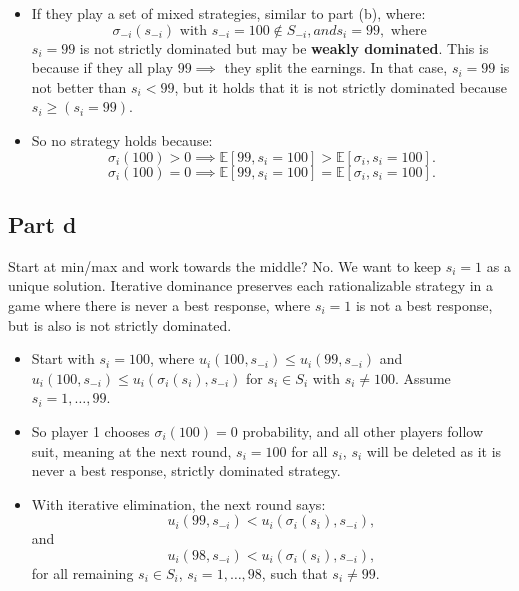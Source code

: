 \documentclass{article}
\begin{document}
\begin{itemize}
    \item If they play a set of mixed strategies, similar to part (b), where:
    \[
    \sigma_{-i}(s_{-i}) \text{ with } s_{-i} = 100 \notin S_{-i}, and s_i = 99, \text{ where }
    \]
    $s_i = 99$ is not strictly dominated but may be \textbf{weakly dominated}. This is because if they all play $99 \implies$ they split the earnings. In that case, $s_i = 99$ is not better than $s_i < 99$, but it holds that it is not strictly dominated because $s_i \geq (s_i = 99)$.
    
    \item So no strategy holds because:
    \[
    \sigma_i(100) > 0 \implies \mathbb{E}[99, s_i = 100] > \mathbb{E}[\sigma_i, s_i = 100].
    \]
    \[
    \sigma_i(100) = 0 \implies \mathbb{E}[99, s_i = 100] = \mathbb{E}[\sigma_i, s_i = 100].
    \]
\end{itemize}

\subsection{Part d}

Start at min/max and work towards the middle? No. We want to keep \( s_i = 1 \) as a unique solution. Iterative dominance preserves each rationalizable strategy in a game where there is never a best response, where \( s_i = 1 \) is not a best response, but is also is not strictly dominated.

\begin{itemize}
    \item Start with \( s_i = 100 \), where \( u_i(100, s_{-i}) \leq u_i(99, s_{-i}) \) and \( u_i(100, s_{-i}) \leq u_i(\sigma_i(s_i), s_{-i}) \) for \( s_i \in S_i \) with \( s_i \neq 100 \). Assume \( s_i = 1, \dots, 99 \).
    \item So player 1 chooses \( \sigma_i(100) = 0 \) probability, and all other players follow suit, meaning at the next round, \( s_i = 100 \) for all \( s_i \), \( s_i \) will be deleted as it is never a best response, strictly dominated strategy.
    \item With iterative elimination, the next round says: 
    \[
    u_i(99, s_{-i}) < u_i(\sigma_i(s_i), s_{-i}),
    \]
    and 
    \[
    u_i(98, s_{-i}) < u_i(\sigma_i(s_i), s_{-i}),
    \]
    for all remaining \( s_i \in S_i \), \( s_i = 1, \dots, 98 \), such that \( s_i \neq 99 \).
\end{itemize}
\end{document}
